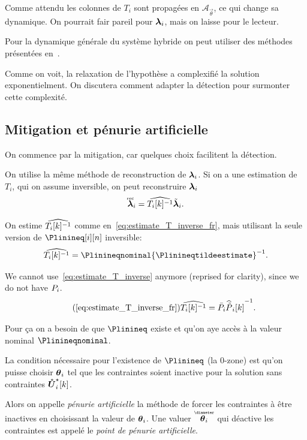 \documentclass[../main.tex]{subfiles}
\begin{document}
Comme attendu les colonnes de $T_{i}$ sont propagées en $\mathcal{A}_{\vec{\theta}}$, ce qui change sa dynamique.
On pourrait fair pareil pour $\boldsymbol{\lambda}_{i}$, mais on laisse pour le lecteur.

Pour la dynamique générale du système hybride on peut utiliser des méthodes présentées en~\cite{BorrelliEtAl2017}.

Comme on voit, la relaxation de l'hypothèse a complexifié la solution exponentielment.
On discutera comment adapter la détection pour surmonter cette complexité.

\subsection{Mitigation et pénurie artificielle}\label{sec:mitigation_ineq_fr}
On commence par la mitigation, car quelques choix facilitent la détection.

On utilise la même méthode de reconstruction de $\boldsymbol{\lambda}_{i}$.
Si on a une estimation de $T_{i}$, qui on assume inversible, on peut reconstruire $\boldsymbol{\lambda}_{i}$
\begin{equation}
  \label{eq:lambda_reconstruction_fr}
  \accentset{\text{rec}}{\boldsymbol{\lambda}}_{i}=\widehat{T_{i}[k]^{-1}} \tilde{\boldsymbol{\lambda}}_{i}.
\end{equation}

On estime $\widehat{T_{i}[k]^{-1}}$ comme en~\eqref{eq:estimate_T_inverse_fr}, mais utilisant la seule version de $\Plinineq[i][n]$ inversible:
\begin{equation}
  \label{eq:estimate_T_inverse_ineq_fr}
  {\Tikinvestimate=\Plinineqnominal{\Plinineqtildeestimate}^{-1}}.
\end{equation}


We cannot use~\eqref{eq:estimate_T_inverse} anymore (reprised for clarity), since we do not have ${P}_{i}$.
\begin{equation}
  \label{eq:estimate_T_inverse_reprise_}
  \tag{\ref*{eq:estimate_T_inverse_fr}}
  {\Tikinvestimate=\Plinnominal{\Plintildeestimate}^{-1}}.
\end{equation}

Pour ça on a besoin de que $\Plinineq$ existe et qu'on aye accès à la valeur nominal $\Plinineqnominal$.

La condition nécessaire pour l'existence de $\Plinineq$ (la $0$-zone) est qu'on puisse choisir $\boldsymbol{\theta}_{i}$ tel que les contraintes soient inactive pour la solution sans contraintes $\optuncUik$.

Alors on appelle \emph{pénurie artificielle} la méthode de forcer les contraintes à être inactives en choisissant la valeur de $\boldsymbol{\theta}_{i}$.
Une valuer $\thetairestricted$ qui déactive les contraintes est appelé le \emph{point de pénurie artificielle}.
\end{document}
